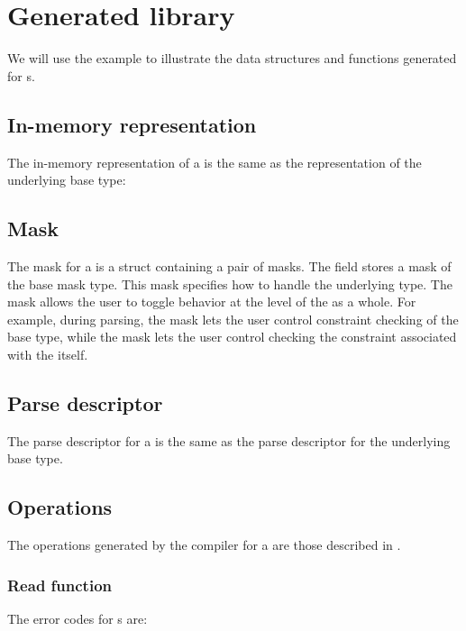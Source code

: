 \section{Generated library}
We will use the  example to illustrate the data structures
and functions generated for \ptypedef{}s.

\subsection{In-memory representation}
\label{sec:typedefs-rep}
The in-memory representation of a \ptypedef{} is the same as the
representation of the underlying base type:



\subsection{Mask}
\label{sec:typedefs-masks}
The mask for a \Ptypedef{} is a \C{} struct containing a pair of masks.  The
 field stores a mask of the base mask type.  This
mask specifies how to handle the underlying type.  The
 mask allows the user to toggle behavior at the level
of the \Ptypedef{} as a whole.  For example, during parsing, the
 mask lets the user control constraint checking of the
base type, while the
 mask lets the user control checking the constraint
associated with the \Ptypedef{} itself.



\subsection{Parse descriptor}
\label{sec:typedefs-parse-descriptors}
The parse descriptor for a \Ptypedef{} is the same as the parse
descriptor for the underlying base type.


\subsection{Operations}

The operations generated by the \pads{} compiler for a \Ptypedef{} are
those described in .

\subsubsection{Read function}
The error codes for \Ptypedef{}s are:

